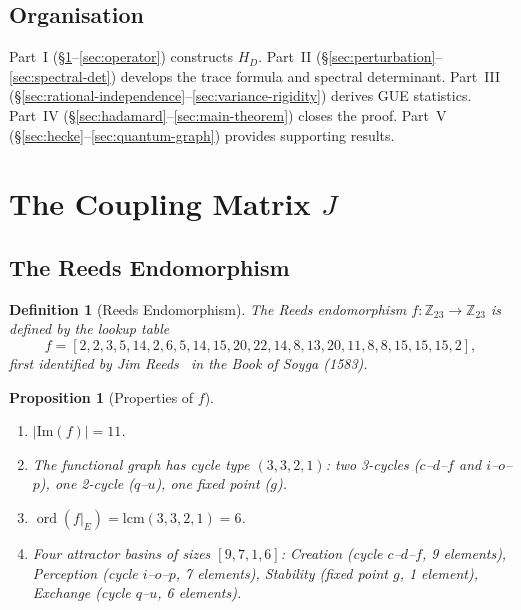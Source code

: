 \documentclass[11pt,a4paper]{article}
\theoremstyle{plain}
\newtheorem{proposition}[theorem]{Proposition}
\newtheorem{definition}[theorem]{Definition}
\theoremstyle{remark}
\newcommand{\Z}{\mathbb{Z}}
\DeclareMathOperator{\ord}{ord}
\begin{document}
\subsection{Organisation}
Part~I (\S\ref{sec:coupling}--\ref{sec:operator}) constructs $H_D$.
Part~II (\S\ref{sec:perturbation}--\ref{sec:spectral-det}) develops
the trace formula and spectral determinant.
Part~III (\S\ref{sec:rational-independence}--\ref{sec:variance-rigidity})
derives GUE statistics.
Part~IV (\S\ref{sec:hadamard}--\ref{sec:main-theorem}) closes the proof.
Part~V (\S\ref{sec:hecke}--\ref{sec:quantum-graph}) provides supporting results.

\section{The Coupling Matrix $J$}\label{sec:coupling}

\subsection{The Reeds Endomorphism}

\begin{definition}[Reeds Endomorphism]\label{def:reeds}
The \emph{Reeds endomorphism} $f\colon\Z_{23}\to\Z_{23}$ is defined by
the lookup table
\[
  f=[2,2,3,5,14,2,6,5,14,15,20,22,14,8,13,20,11,8,8,15,15,15,2],
\]
first identified by Jim Reeds~\cite{reeds2006} in the \emph{Book of Soyga} (1583).
\end{definition}

\begin{proposition}[Properties of $f$]\label{prop:reeds-properties}
\begin{enumerate}[nosep,label=(\roman*)]
  \item $|\mathrm{Im}(f)|=11$.
  \item The functional graph has cycle type $(3,3,2,1)$: two 3-cycles
        ($c$--$d$--$f$ and $i$--$o$--$p$), one 2-cycle ($q$--$u$),
        one fixed point ($g$).
  \item $\ord(f|_E)=\mathrm{lcm}(3,3,2,1)=6$.
  \item Four attractor basins of sizes $[9,7,1,6]$:
        Creation (cycle $c$--$d$--$f$, 9 elements),
        Perception (cycle $i$--$o$--$p$, 7 elements),
        Stability (fixed point $g$, 1 element),
        Exchange (cycle $q$--$u$, 6 elements).
\end{enumerate}
\end{proposition}
\end{document}
